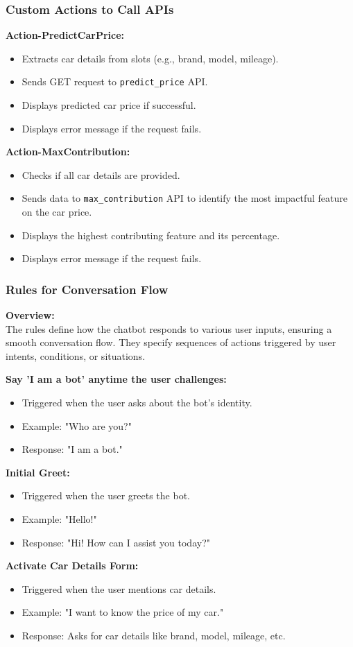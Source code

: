 \documentclass{beamer}
\begin{document}
\begin{frame}
	\frametitle{Custom Actions to Call APIs}

	\textbf{Action-PredictCarPrice:}
	\begin{itemize}
		\item Extracts car details from slots (e.g., brand, model, mileage).
		\item Sends GET request to \texttt{predict\_price} API.
		\item Displays predicted car price if successful.
		\item Displays error message if the request fails.
	\end{itemize}

	\textbf{Action-MaxContribution:}
	\begin{itemize}
		\item Checks if all car details are provided.
		\item Sends data to \texttt{max\_contribution} API to identify the most impactful feature on the car price.
		\item Displays the highest contributing feature and its percentage.
		\item Displays error message if the request fails.
	\end{itemize}
\end{frame}

\begin{frame}
	\frametitle{Rules for Conversation Flow}

	\textbf{Overview:} \\
	The rules define how the chatbot responds to various user inputs, ensuring a smooth conversation flow. They specify sequences of actions triggered by user intents, conditions, or situations. 
	
\textbf{Say 'I am a bot' anytime the user challenges:}
	\begin{itemize}
		\item Triggered when the user asks about the bot's identity.
		\item Example: "Who are you?"
		\item Response: "I am a bot."
	\end{itemize}
	
	\textbf{Initial Greet:}
	\begin{itemize}
		\item Triggered when the user greets the bot.
		\item Example: "Hello!"
		\item Response: "Hi! How can I assist you today?"
	\end{itemize}

	\textbf{Activate Car Details Form:}
	\begin{itemize}
		\item Triggered when the user mentions car details.
		\item Example: "I want to know the price of my car."
		\item Response: Asks for car details like brand, model, mileage, etc.
	\end{itemize}
\end{frame}
\end{document}
